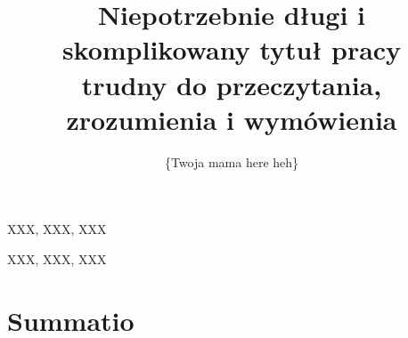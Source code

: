 \documentclass[
    left=2.5cm,         %
    right=2.5cm,        %
    top=2.5cm,          %
    bottom=3cm,         %
    bindingoffset=6mm,  %
    nohyphenation=false %
]{eiti/eiti-thesis}
\begin{document}
\MasterThesis %
{}
\title{
    Niepotrzebnie długi i skomplikowany tytuł pracy \\
    trudny do przeczytania, zrozumienia i wymówienia
}
\author{\{Twoja mama here heh\}}
\date{\the\year}
\maketitle

\cleardoublepage %
\streszczenie \lipsum[1-3]
\slowakluczowe XXX, XXX, XXX

\newpage
\abstract \kant[1-3]
\keywords XXX, XXX, XXX


\cleardoublepage %
\tableofcontents

\cleardoublepage %
\pagestyle{headings}


\newpage %
\section{Summatio}          %
\lipsum[5-10]
\end{document}
